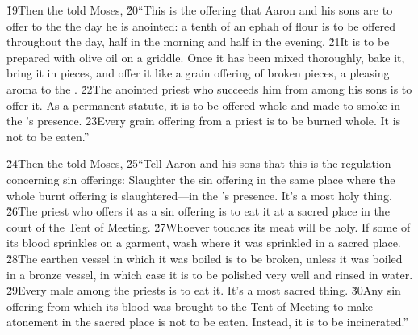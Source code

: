 \v{19}Then the  told Moses, \v{20}``This is the offering that Aaron and his sons are to offer to the  the day he is anointed: a tenth of an ephah of flour is to be offered throughout the day, half in the morning and half in the evening. \v{21}It is to be prepared with olive oil on a griddle. Once it has been mixed thoroughly, bake it, bring it in pieces, and offer it like a grain offering of broken pieces, a pleasing aroma to the . \v{22}The anointed priest who succeeds him from among his sons is to offer it. As a permanent statute, it is to be offered whole and made to smoke in the 's presence. \v{23}Every grain offering from a priest is to be burned whole. It is not to be eaten.''

\v{24}Then the  told Moses, \v{25}``Tell Aaron and his sons that this is the regulation concerning sin offerings: Slaughter the sin offering in the same place where the whole burnt offering is slaughtered---in the 's presence. It's a most holy thing. \v{26}The priest who offers it as a sin offering is to eat it at a sacred place in the court of the Tent of Meeting. \v{27}Whoever touches its meat will be holy. If some of its blood sprinkles on a garment, wash where it was sprinkled in a sacred place. \v{28}The earthen vessel in which it was boiled is to be broken, unless it was boiled in a bronze vessel, in which case it is to be polished very well and rinsed in water. \v{29}Every male among the priests is to eat it. It's a most sacred thing. \v{30}Any sin offering from which its blood was brought to the Tent of Meeting to make atonement in the sacred place is not to be eaten. Instead, it is to be incinerated.''

